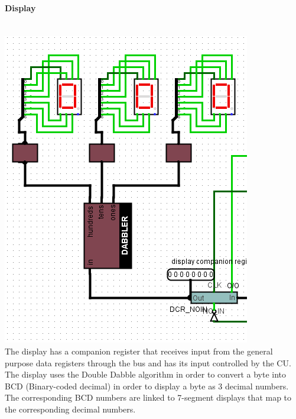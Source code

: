 \documentclass{mcgillhomework}
\begin{document}
	\paragraph{Display}~
	\\\includegraphics[scale=0.5]{DIS}\\The display has a companion register that receives input from the general purpose data registers through the bus and has its input controlled by the CU. The display uses the Double Dabble algorithm in order to convert a byte into BCD (Binary-coded decimal) in order to display a byte as $3$ decimal numbers. The corresponding BCD numbers are linked to 7-segment displays that map to the corresponding decimal numbers.
\end{document}
